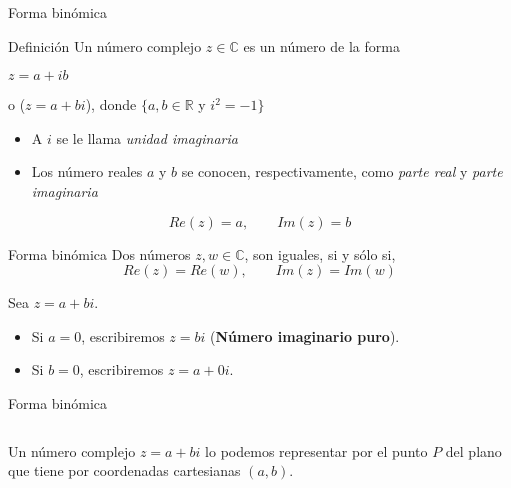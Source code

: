 \begin{frame}[c]{Forma binómica}
  \begin{block}{Definición}
    Un número complejo $z \in \mathbb{C}$ es un número de la forma
    \begin{center}
      $z = a + ib$
    \end{center}
    o ($z = a + bi$), donde $ \{ a,b \in \mathbb{R}$ y
    $ i^2 = -1 \}$
  \end{block}
  \pausa
  \begin{itemize}
    \item A $i$ se le llama \emph{unidad imaginaria}
    \item Los número reales $a$ y $b$ se conocen, respectivamente, como
      \emph{parte real} y \emph{parte imaginaria}
  \end{itemize}
  \begin{displaymath}
    Re(z) = a, \qquad  Im(z) = b
  \end{displaymath}
\end{frame}

\begin{frame}[c]{Forma binómica}
  Dos números $z,w \in \mathbb{C}$, son iguales, si y sólo si,
  \begin{displaymath}
    Re(z) = Re(w), \qquad  Im(z) = Im(w)
  \end{displaymath}

  Sea $z = a + bi$.
  \begin{itemize}
    \item Si $a=0$, escribiremos $z=bi$ (\textbf{Número imaginario puro}).
    \item Si $b=0$, escribiremos $z=a + 0i$.
  \end{itemize}
\end{frame}

\begin{frame}[c]{Forma binómica}
  \begin{columns}
      Un número complejo $z = a+bi$ lo podemos representar por el punto $P$
      del plano que tiene por coordenadas cartesianas $(a,b)$.
  \end{columns}
\end{frame}


